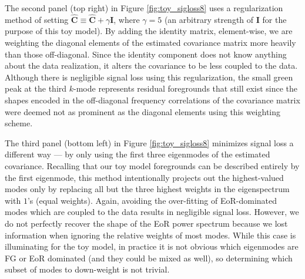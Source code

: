 \documentclass[preprint2,numberedappendix,tighten]{aastex6}  %
\begin{document}
%
The second panel (top right) in Figure \ref{fig:toy_sigloss8} uses a regularization method of setting $\widehat{\textbf{C}} \equiv 
\widehat{\textbf{C}} + \gamma\textbf{I}$, where $\gamma = 5$ (an arbitrary strength 
of $\textbf{I}$ for the purpose of this toy model). By adding the identity matrix, element-wise, we are weighting the diagonal 
elements of the estimated covariance matrix more heavily than those off-diagonal. Since the identity component does not know anything about the data realization, it alters the covariance to be less coupled to the data. Although there is negligible signal loss using this regularization, the small green peak at the third $k$-mode represents residual foregrounds that still exist since the shapes encoded in the off-diagonal frequency correlations of the covariance matrix were deemed not as prominent as the diagonal elements using this weighting scheme. 

The third panel (bottom left) in Figure \ref{fig:toy_sigloss8} minimizes signal loss a different way --- 
by only using the first three eigenmodes of the estimated covariance. Recalling that our toy model foregrounds can be described entirely by the first eigenmode, this 
method intentionally projects out the highest-valued modes only by replacing all but the three highest weights in the 
eigenspectrum with $1$'s (equal weights). Again, avoiding the over-fitting of EoR-dominated modes which are coupled to the data results in negligible signal loss. However, we do 
not perfectly recover the shape of the EoR power spectrum because we lost information when ignoring the relative weights of most modes. While this case is illuminating for the toy model, in practice it is not obvious which eigenmodes are FG or EoR dominated (and they could be mixed as well), so determining which subset of modes to down-weight is not trivial. 
\end{document}
